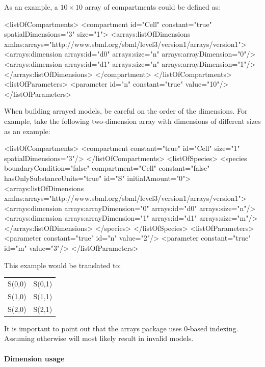 As an example, a $10 \times 10$ array of compartments  could be defined as:

\begin{example}
<listOfCompartments>
    <compartment id="Cell" constant="true" spatialDimensions="3" size="1">
        <arrays:listOfDimensions
            xmlns:arrays="http://www.sbml.org/sbml/level3/version1/arrays/version1">
            <arrays:dimension arrays:id="d0" arrays:size="n" arrays:arrayDimension="0"/>
            <arrays:dimension arrays:id="d1" arrays:size="n" arrays:arrayDimension="1"/>
        </arrays:listOfDimensions>
    </compartment>
</listOfCompartments>
<listOfParameters>
    <parameter id="n" constant="true" value="10"/>
</listOfParameters>
\end{example}

When building arrayed models, be careful on the order of the
dimensions. For example, take the following two-dimension array with
dimensions of different sizes as an example: 

\begin{example}
<listOfCompartments>
      <compartment constant="true" id="Cell" size="1"
      spatialDimensions="3"/>
</listOfCompartments>
<listOfSpecies>
      <species boundaryCondition="false" compartment="Cell" constant="false" hasOnlySubstanceUnits="true" id="S" initialAmount="0">
        <arrays:listOfDimensions xmlns:arrays="http://www.sbml.org/sbml/level3/version1/arrays/version1">
          <arrays:dimension arrays:arrayDimension="0" arrays:id="d0" arrays:size="n"/>
          <arrays:dimension arrays:arrayDimension="1" arrays:id="d1" arrays:size="m"/>
        </arrays:listOfDimensions>
      </species>
</listOfSpecies>
<listOfParameters>
      <parameter constant="true" id="n" value="2"/>
      <parameter constant="true" id="m" value="3"/>
</listOfParameters>
\end{example}

This example would be translated to:

\begin{tabular}{c c }
 S(0,0)  &  S(0,1) \\
S(1,0)   &  S(1,1) \\ 
S(2,0)   &S(2,1) \\
\end{tabular}

It is important to point out that the arrays package uses 0-based
indexing. Assuming otherwise will most likely result in invalid models.

\paragraph{Dimension usage}
\label{sec:dimensionUsage}

